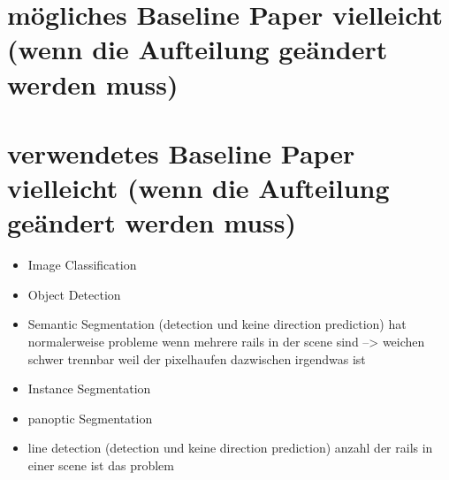
\clearpage




\clearpage



\section{mögliches Baseline Paper vielleicht (wenn die Aufteilung geändert werden muss)}

\section{verwendetes Baseline Paper vielleicht (wenn die Aufteilung geändert werden muss)}

\begin{itemize}
    \item Image Classification
    \item Object Detection
    \item Semantic Segmentation (detection und keine direction prediction) hat normalerweise probleme wenn mehrere rails in der scene sind --> weichen schwer trennbar weil der pixelhaufen dazwischen irgendwas ist
    \item Instance Segmentation
    \item panoptic Segmentation
    \item line detection (detection und keine direction prediction) anzahl der rails in einer scene ist das problem
\end{itemize}